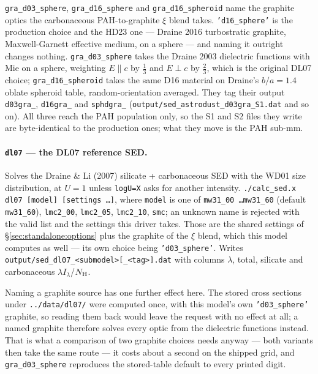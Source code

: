 \documentclass{my_memo}
\newcommand{\code}[1]{\texttt{#1}}
\newcommand{\lamIlam}{\ensuremath{\lambda I_\lambda}}
\newcommand{\Nh}{\ensuremath{N_{\rm H}}}
\begin{document}
\code{gra\_d03\_sphere}, \code{gra\_d16\_sphere} and \code{gra\_d16\_spheroid}
name the graphite optics the carbonaceous PAH-to-graphite $\xi$ blend takes.
\code{'d16\_sphere'} is the production choice and the HD23 one --- Draine 2016
turbostratic graphite, Maxwell-Garnett effective medium, on a sphere --- and
naming it outright changes nothing. \code{gra\_d03\_sphere} takes the Draine
2003 dielectric functions with Mie on a sphere, weighting $E \parallel c$ by
$\tfrac{1}{3}$ and $E \perp c$ by $\tfrac{2}{3}$, which is the original DL07
choice; \code{gra\_d16\_spheroid} takes the same D16 material on Draine's
$b/a = 1.4$ oblate spheroid table, random-orientation averaged. They tag their
output \code{d03gra\_}, \code{d16gra\_} and \code{sphdgra\_}
(\code{output/sed\_astrodust\_d03gra\_S1.dat} and so on). All three
reach the PAH population only, so the S1 and S2 files they write are
byte-identical to the production ones; what they move is the PAH sub-mm.

\paragraph{\code{dl07} --- the DL07 reference SED.} Solves the Draine \& Li (2007) silicate + carbonaceous SED with the WD01 size
distribution, at $U = 1$ unless \code{logU=X} asks for another intensity.
\code{./calc\_sed.x dl07 [model] [settings \ldots]}, where \code{model} is one of
\code{mw31\_00 \ldots mw31\_60} (default \code{mw31\_60}), \code{lmc2\_00},
\code{lmc2\_05}, \code{lmc2\_10}, \code{smc}; an unknown name is rejected with
the valid list and the settings this driver takes. Those are the shared settings
of \S\ref{sec:standalone:options} plus the graphite of the $\xi$ blend, which
this model computes as well --- its own choice being \code{'d03\_sphere'}.
Writes \code{output/sed\_dl07\_<submodel>[\_<tag>].dat} with columns
$\lambda$, total, silicate and carbonaceous \lamIlam/\Nh.

Naming a graphite source has one further effect here. The stored cross sections
under \code{../data/dl07/} were computed once, with this model's own
\code{'d03\_sphere'} graphite, so reading them back would leave the request with
no effect at all; a named graphite therefore solves every optic from the
dielectric functions instead. That is what a comparison of two graphite choices
needs anyway --- both variants then take the same route --- it costs about a
second on the shipped grid, and \code{gra\_d03\_sphere} reproduces the
stored-table default to every printed digit.
\end{document}
